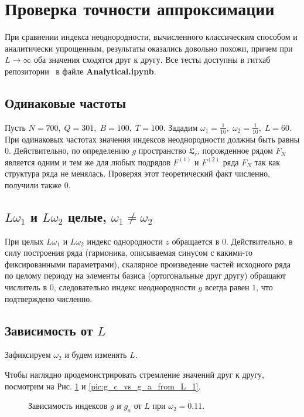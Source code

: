\documentclass[specialist, substylefile = spbu.rtx,
			   subf, href, 12pt]{disser}
\begin{document}
\section{Проверка точности аппроксимации}
При сравнении индекса неоднородности, вычисленного классическим способом и аналитически упрощенным, результаты оказались довольно похожи, причем при $L \rightarrow \infty $ оба значения сходятся друг к другу. Все тесты доступны в гитхаб репозитории~\cite{Kononykhin2022} в файле \textbf{Analytical.ipynb}.



\subsection{Одинаковые частоты}
Пусть $ N = 700,\; Q = 301,\; B = 100,\; T = 100 $. 
Зададим $\omega_1 = \frac{1}{10},\; \omega_2 = \frac{1}{10},\; L = 60$. При одинаковых частотах значения индексов неоднородности должны быть равны $ 0 $. Действительно, по определению $ g $ пространство $ \mathfrak{L}_r $, порожденное рядом $ F_N $ является одним и тем же для любых подрядов $ F^{(1)} $ и $ F^{(2)} $ ряда $ F_N $ так как структура ряда не менялась.
Проверяя этот теоретический факт численно, получили также $ 0 $.

\subsection{$L\omega_1$ и $L\omega_2 $ целые, $\omega_1 \neq \omega_2 $}
При целых $L\omega_1$ и $L\omega_2 $ индекс однородности $ z $ обращается в 0. Действительно, в силу построения ряда (гармоника, описываемая синусом с какими-то фиксированными параметрами), скалярное произведение частей исходного ряда по целому периоду на элементы базиса (ортогональные друг другу) обращают числитель в 0, следовательно индекс неоднородности $ g $ всегда равен $ 1 $, что подтверждено численно.


\subsection{Зависимость от $ L $}

Зафиксируем $ \omega_2 $ и будем изменять $ L $. 

Чтобы наглядно продемонстрировать стремление значений друг к другу, посмотрим на Рис. \ref{pic:g_c_vs_g_a_from_L} и \ref{pic:g_c_vs_g_a_from_L_1}.

\begin{figure}[!hhh]
	\caption{Зависимость индексов $ g $ и $ g_a $ от $ L $ при $ \omega_2 = 0.11 $.}
	\label{pic:g_c_vs_g_a_from_L}
\end{figure}
\end{document}
